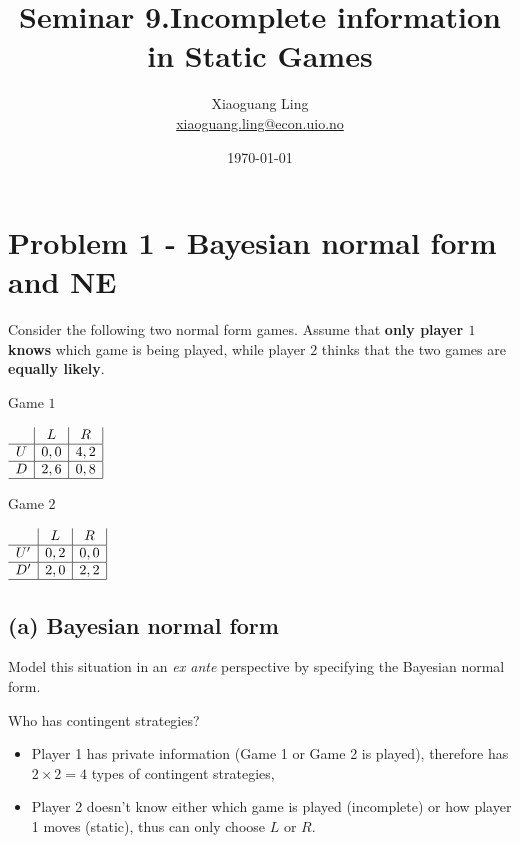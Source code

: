 \documentclass{article}
\title{Seminar 9.Incomplete information in Static Games}
\author{Xiaoguang Ling \\  \href{xiaoguang.ling@econ.uio.no}{xiaoguang.ling@econ.uio.no}}
\date{\today}
\begin{document}
\maketitle

\section{Problem 1 - Bayesian normal form and NE}

Consider the following two normal form games. Assume that \textbf{only player $1$ knows} which game is being played, while player $2$ thinks that the two games are \textbf{equally likely}.\vspace{-21pt}

\begin{center}
Game $1$ \vspace{6pt}

$
\begin{array}{c|c|c|}
 & L & R \\
\hline
U & 0,0 & 4,2 \\
\hline
D & 2,6 & 0,8 \\
\hline
\end{array}
$
\end{center}

\begin{center}
Game $2$ \vspace{6pt}

$
\begin{array}{c|c|c|}
 & L & R \\
\hline
U' & 0,2 & 0,0 \\
\hline
D' & 2,0 & 2,2 \\
\hline
\end{array}
$
\end{center}
\subsection*{(a) Bayesian normal form}
Model this situation in an \textit{ex ante} perspective by specifying the Bayesian normal form.

\begin{mdframed}[backgroundcolor=blue!20,linecolor=white]

Who has contingent strategies?

\begin{itemize}
\item Player 1 has private information (Game 1 or Game 2 is played), therefore has $2 \times 2 = 4$ types of contingent strategies,
\item Player 2 doesn't know either which game is played (incomplete) or how player 1 moves (static), thus can only choose $L$ or $R$.
\end{itemize}
\end{mdframed}
\end{document}
